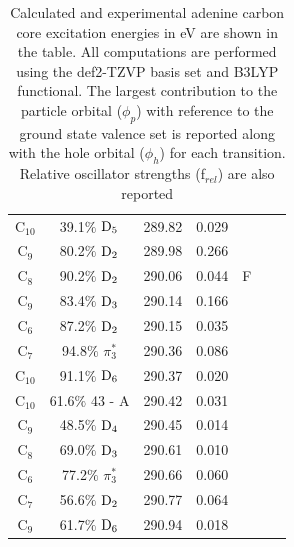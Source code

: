 \documentclass[12pt]{article}
\begin{document}
\begin{table}
\begin{tabular}{c@{\hskip 0.22in}c@{\hskip 0.22in}c@{\hskip 0.22in}c@{\hskip 0.52in}c@{\hskip 0.22in}c@{\hskip 0.22in}c}
    C$_{10}$
 &   39.1$\%$ $\rm D_5$  & 289.82 & 0.029 & \multirow{5}{*}{F} \\
    C$_9$
 &   80.2$\%$ $\rm D_2$  & 289.98 & 0.266 \\
    C$_8$
 &   90.2$\%$ $\rm D_2$  & 290.06 & 0.044 \\
    C$_9$
 &   83.4$\%$ $\rm D_3$  & 290.14 & 0.166 \\
    C$_6$
 &   87.2$\%$ $\rm D_2$  & 290.15 & 0.035 
 \vspace{0.1in}\\
    C$_7$
 &   94.8$\%$ $\pi_3^*$  & 290.36 & 0.086 \\
    C$_{10}$
 &   91.1$\%$ $\rm D_6$  & 290.37 & 0.020 \\
    C$_{10}$
 &   61.6$\%$ 43 - A  & 290.42 & 0.031 \\
    C$_9$
 &   48.5$\%$ $\rm D_4$  & 290.45 & 0.014 \\
    C$_8$
 &   69.0$\%$ $\rm D_3$  & 290.61 & 0.010 \\
    C$_6$
 &   77.2$\%$ $\pi_3^*$  & 290.66 & 0.060 \\
    C$_7$
 &   56.6$\%$ $\rm D_2$  & 290.77 & 0.064 \\
    C$_9$
 &   61.7$\%$ $\rm D_6$  & 290.94 & 0.018 \\
   \end{tabular}
      \caption{Calculated and experimental adenine carbon core excitation energies in eV are shown in the table. All computations are performed using the def2-TZVP basis set and B3LYP functional. The largest contribution to the particle orbital ($\phi_p$) with reference to the ground state valence set is reported along with the hole orbital ($\phi_h$) for each transition. Relative oscillator strengths (f$_{rel}$) are also reported}
   \label{table: adenine_k_nitrogen}
   \end{table}
\end{document}
